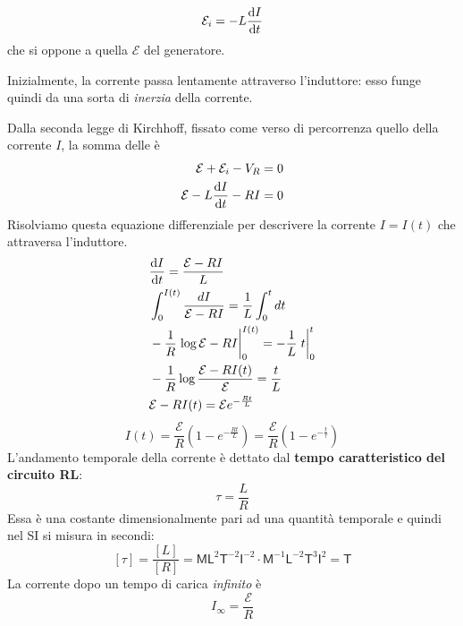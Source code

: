 \begin{equation*}
	\mathcal{E}_i=-L\dv{I}{t}
\end{equation*}
che si oppone a quella $\mathcal{E}$ del generatore.
\begin{observe}
	Inizialmente, la corrente passa lentamente attraverso l'induttore: esso funge quindi da una sorta di \textit{inerzia} della corrente.
\end{observe}
Dalla seconda legge di Kirchhoff, fissato come verso di percorrenza quello della corrente $I$, la somma delle \ddp è
\begin{align*}
	\mathcal{E}+\mathcal{E}_i-V_R=0\\
	\mathcal{E}-L\dv{I}{t}-RI=0
\end{align*}
Risolviamo questa equazione differenziale per descrivere la corrente $I=I(t)$ che attraversa l'induttore.
\begin{align*}%
	&\dv{I}{t}=\frac{\mathcal{E}-RI}{L}\\ &\int_{0}^{I(t)}\frac{dI}{\mathcal{E}-RI}=\frac{1}{L}\int_{0}^{t}dt\\
	&-\frac{1}{R}\eval{\log{\mathcal{E}-RI}}_{0}^{I(t)}=-\frac{1}{L}\eval{t}_{0}^{t}\\
	&-\frac{1}{R}\log{\frac{\mathcal{E}-RI(t)}{\mathcal{E}}}=\frac{t}{L}\\
	&\mathcal{E}-RI(t)=\mathcal{E}e^{-\frac{Rt}{L}}
\end{align*}
\begin{equation}
	I(t)=\frac{\mathcal{E}}{R}\left(1-e^{-\frac{Rt}{L}}\right)=\frac{\mathcal{E}}{R}\left(1-e^{-\frac{t}{\tau}}\right)
\end{equation}
L'andamento temporale della corrente è dettato dal \textbf{tempo caratteristico del circuito RL}:
\begin{equation}
	\tau=\frac{L}{R}
\end{equation}
Essa è una costante dimensionalmente pari ad una quantità temporale e quindi nel SI si misura in secondi:
\begin{equation*}
	\left[\tau\right]=\frac{\left[L\right]}{\left[R\right]}=\mathsf{M} \mathsf{L}^2 \mathsf{T}^{-2} \mathsf{I}^{-2}\cdot \mathsf{M}^{-1} \mathsf{L}^{-2}  \mathsf{T}^3 \mathsf{I}^{2}=\mathsf{T}
\end{equation*}
La corrente dopo un tempo di carica \textit{infinito} è 
\begin{equation}
	I_{\infty}=\frac{\mathcal{E}}{R}
\end{equation}
